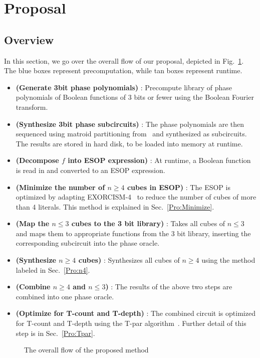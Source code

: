 
\section{Proposal}
\label{Pro}
\subsection{Overview}

In this section, we go over the overall flow of our proposal, depicted in Fig.~\ref{fig-flow}. The blue boxes
represent precomputation, while tan boxes represent runtime.

\begin{itemize}
\item \textbf{(Generate 3bit phase polynomials)} : Precompute library of phase polynomials of Boolean functions of
  3 bits or fewer using the Boolean Fourier transform.
\item \textbf{(Synthesize 3bit phase subcircuits)} : The phase polynomials are then sequenced using matroid
  partitioning from~\cite{bib-amy-matroid} and synthesized as subcircuits. The results are stored in hard disk,
  to be loaded into memory at runtime.
\item \textbf{(Decompose $f$ into ESOP expression)} : At runtime, a Boolean function is read in and converted to
  an ESOP expression.
\item \textbf{(Minimize the number of $n \geq 4$ cubes in ESOP)} : The ESOP is optimized by adapting
  EXORCISM-4~\cite{bib-exorcism} to reduce the number of cubes of more than 4 literals. This method is explained
  in Sec.~\ref{Pro:Minimize}.
\item \textbf{(Map the $n \leq 3$ cubes to the 3 bit library)} : Takes all cubes of $n \leq 3$ and maps them to 
  appropriate functions from the 3 bit library, inserting the corresponding subcircuit into the phase oracle.
\item \textbf{(Synthesize $n \geq 4$ cubes)} : Synthesizes all cubes of $n \geq 4$ using the method labeled in
  Sec.~\ref{Pro:n4}.
\item \textbf{(Combine $n \geq 4$ and $n \leq 3$)} : The results of the above two steps are combined into one
  phase oracle.
\item \textbf{(Optimize for T-count and T-depth)} : The combined circuit is optimized for T-count and T-depth using
  the T-par algorithm~\cite{bib-amy-matroid}. Further detail of this step is in Sec.~\ref{Pro:Tpar}.
\end{itemize}
\begin{figure}[t]
  \centering
  \scalebox{1.0} {
    
  }
  \caption{The overall flow of the proposed method}
  \label{fig-flow}
\end{figure}

